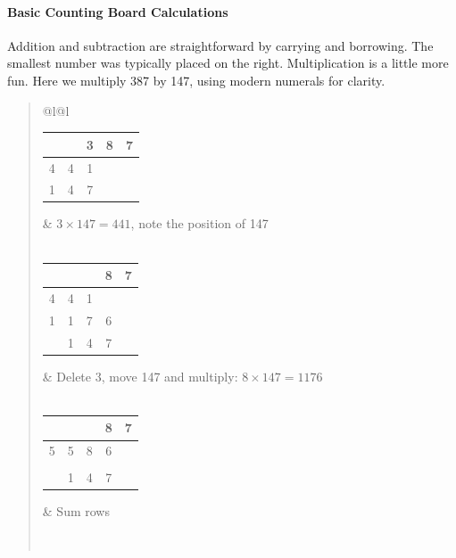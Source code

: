 \paragraph{Basic Counting Board Calculations}

Addition and subtraction are straightforward by carrying and borrowing. The smallest number was typically placed on the right. Multiplication is a little more fun. Here we multiply 387 by 147, using modern numerals for clarity.
\begin{quote}
  \begin{tabular}{@{}l@{\qquad}l}
  	\begin{tabular}{|c|c|c|c|c|}
		  \hline
		  &&3&8&7\\\hline
		  4&4&1&&\\\hline
		  1&4&7&&\\\hline
  	\end{tabular}
		&
		$3\times 147=441$, note the position of 147
		\\
		\\[-6pt]
	  \begin{tabular}{|c|c|c|c|c|}
		  \hline
		  &&&8&7\\\hline
		  4&4&1&&\\\hline
		  1&1&7&6&\\\hline
		  &1&4&7&\\\hline
	  \end{tabular}
		&
		Delete 3, move 147 and multiply: $8\times 147=1176$
		\\
		\\[-6pt]
	  \begin{tabular}{|c|c|c|c|c|}
		  \hline
		  &&&8&7\\\hline
		  5&5&8&6&\\\hline
		  &&&&\\\hline
		  &1&4&7&\\\hline
	  \end{tabular}
		&
		Sum rows
		\\
		\\[-6pt]
	  \begin{tabular}{|c|c|c|c|c|}

\end{tabular}
\end{tabular}
\end{quote}

